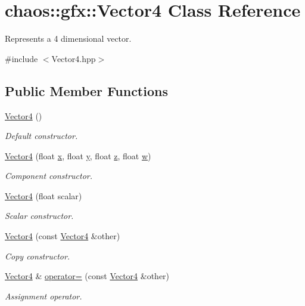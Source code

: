 \hypertarget{classchaos_1_1gfx_1_1_vector4}{}\section{chaos\+:\+:gfx\+:\+:Vector4 Class Reference}
\label{classchaos_1_1gfx_1_1_vector4}


Represents a 4 dimensional vector.  




{\ttfamily \#include $<$Vector4.\+hpp$>$}

\subsection*{Public Member Functions}
\begin{DoxyCompactItemize}
\item 
\hyperlink{classchaos_1_1gfx_1_1_vector4_abdee87e0c5bbd7a9870957951f2bba80}{Vector4} ()
\begin{DoxyCompactList}\small\item\em Default constructor. \end{DoxyCompactList}\item 
\hyperlink{classchaos_1_1gfx_1_1_vector4_a8e22c6ae7ba175d15bd8804cff77519e}{Vector4} (float \hyperlink{classchaos_1_1gfx_1_1_vector4_a74f8e26ec8f6c55a11ed5a423fb0eec4}{x}, float \hyperlink{classchaos_1_1gfx_1_1_vector4_aa823679c8ce9d8b882f7e05f5670ee74}{y}, float \hyperlink{classchaos_1_1gfx_1_1_vector4_ae1e282cb0c262db6c20f29c34d727938}{z}, float \hyperlink{classchaos_1_1gfx_1_1_vector4_a3cd40a2e6ce1fd10a0d2c8136965e9dd}{w})
\begin{DoxyCompactList}\small\item\em Component constructor. \end{DoxyCompactList}\item 
\hyperlink{classchaos_1_1gfx_1_1_vector4_aa2630f2dfef3d7a9ae5b284be502f528}{Vector4} (float scalar)
\begin{DoxyCompactList}\small\item\em Scalar constructor. \end{DoxyCompactList}\item 
\hyperlink{classchaos_1_1gfx_1_1_vector4_aabd97977b6470d2e03ab15d7fe5e0678}{Vector4} (const \hyperlink{classchaos_1_1gfx_1_1_vector4}{Vector4} \&other)
\begin{DoxyCompactList}\small\item\em Copy constructor. \end{DoxyCompactList}\item 
\hyperlink{classchaos_1_1gfx_1_1_vector4}{Vector4} \& \hyperlink{classchaos_1_1gfx_1_1_vector4_ad6b4eb3482cb75173ca23edd9f352930}{operator=} (const \hyperlink{classchaos_1_1gfx_1_1_vector4}{Vector4} \&other)
\begin{DoxyCompactList}\small\item\em Assignment operator. \end{DoxyCompactList}\end{DoxyCompactItemize}
